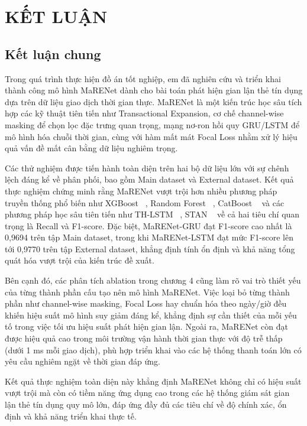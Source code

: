%
\newpage
\section*{KẾT LUẬN}
\subsection*{Kết luận chung}

Trong quá trình thực hiện đồ án tốt nghiệp, em đã nghiên cứu và triển khai thành công mô hình MaRENet dành cho bài toán phát hiện gian lận thẻ tín dụng dựa trên dữ liệu giao dịch thời gian thực. MaRENet là một kiến trúc học sâu tích hợp các kỹ thuật tiên tiến như Transactional Expansion, cơ chế channel-wise masking để chọn lọc đặc trưng quan trọng, mạng nơ-ron hồi quy GRU/LSTM để mô hình hóa chuỗi thời gian, cùng với hàm mất mát Focal Loss nhằm xử lý hiệu quả vấn đề mất cân bằng dữ liệu nghiêm trọng.

Các thử nghiệm được tiến hành toàn diện trên hai bộ dữ liệu lớn với sự chênh lệch đáng kể về phân phối, bao gồm Main dataset và External dataset. Kết quả thực nghiệm chứng minh rằng MaRENet vượt trội hơn nhiều phương pháp truyền thống phổ biến như XGBoost ~\cite{chen2016xgboost}, Random Forest ~\cite{breiman2001random}, CatBoost ~\cite{prokhorenkova2018catboost} và các phương pháp học sâu tiên tiến như TH-LSTM ~\cite{Xie2022}, STAN ~\cite{cheng2020spatio} về cả hai tiêu chí quan trọng là Recall và F1-score. Đặc biệt, MaRENet-GRU đạt F1-score cao nhất là 0,9694 trên tập Main dataset, trong khi MaRENet-LSTM đạt mức F1-score lên tới 0,9770 trên tập External dataset, khẳng định tính ổn định và khả năng tổng quát hóa vượt trội của kiến trúc đề xuất.

Bên cạnh đó, các phân tích ablation trong chương 4 cũng làm rõ vai trò thiết yếu của từng thành phần cấu tạo nên mô hình MaRENet. Việc loại bỏ từng thành phần như channel-wise masking, Focal Loss hay chuẩn hóa theo ngày/giờ đều khiến hiệu suất mô hình suy giảm đáng kể, khẳng định sự cần thiết của mỗi yếu tố trong việc tối ưu hiệu suất phát hiện gian lận. Ngoài ra, MaRENet còn đạt được hiệu quả cao trong môi trường vận hành thời gian thực với độ trễ thấp (dưới 1 ms mỗi giao dịch), phù hợp triển khai vào các hệ thống thanh toán lớn có yêu cầu nghiêm ngặt về thời gian đáp ứng.

Kết quả thực nghiệm toàn diện này khẳng định MaRENet không chỉ có hiệu suất vượt trội mà còn có tiềm năng ứng dụng cao trong các hệ thống giám sát gian lận thẻ tín dụng quy mô lớn, đáp ứng đầy đủ các tiêu chí về độ chính xác, ổn định và khả năng triển khai thực tế.

